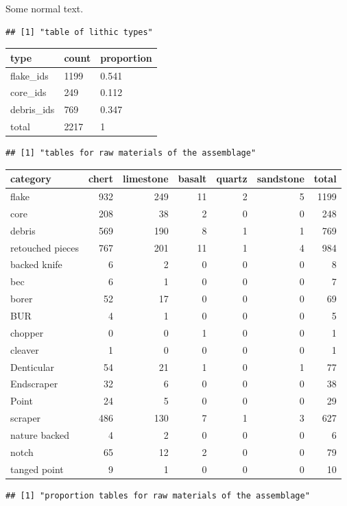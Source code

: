 \documentclass[]{article}
\title{}
\author{}
\date{}
\begin{document}
Some normal text.

\begin{verbatim}
## [1] "table of lithic types"
\end{verbatim}

\begin{longtable}[]{@{}lll@{}}
\toprule
type & count & proportion\tabularnewline
\midrule
\endhead
flake\_ids & 1199 & 0.541\tabularnewline
core\_ids & 249 & 0.112\tabularnewline
debris\_ids & 769 & 0.347\tabularnewline
total & 2217 & 1\tabularnewline
\bottomrule
\end{longtable}

\begin{verbatim}
## [1] "tables for raw materials of the assemblage"
\end{verbatim}

\begin{longtable}[]{@{}lrrrrrr@{}}
\toprule
category & chert & limestone & basalt & quartz & sandstone &
total\tabularnewline
\midrule
\endhead
flake & 932 & 249 & 11 & 2 & 5 & 1199\tabularnewline
core & 208 & 38 & 2 & 0 & 0 & 248\tabularnewline
debris & 569 & 190 & 8 & 1 & 1 & 769\tabularnewline
retouched pieces & 767 & 201 & 11 & 1 & 4 & 984\tabularnewline
backed knife & 6 & 2 & 0 & 0 & 0 & 8\tabularnewline
bec & 6 & 1 & 0 & 0 & 0 & 7\tabularnewline
borer & 52 & 17 & 0 & 0 & 0 & 69\tabularnewline
BUR & 4 & 1 & 0 & 0 & 0 & 5\tabularnewline
chopper & 0 & 0 & 1 & 0 & 0 & 1\tabularnewline
cleaver & 1 & 0 & 0 & 0 & 0 & 1\tabularnewline
Denticular & 54 & 21 & 1 & 0 & 1 & 77\tabularnewline
Endscraper & 32 & 6 & 0 & 0 & 0 & 38\tabularnewline
Point & 24 & 5 & 0 & 0 & 0 & 29\tabularnewline
scraper & 486 & 130 & 7 & 1 & 3 & 627\tabularnewline
nature backed & 4 & 2 & 0 & 0 & 0 & 6\tabularnewline
notch & 65 & 12 & 2 & 0 & 0 & 79\tabularnewline
tanged point & 9 & 1 & 0 & 0 & 0 & 10\tabularnewline
\bottomrule
\end{longtable}

\begin{verbatim}
## [1] "proportion tables for raw materials of the assemblage"
\end{verbatim}
\end{document}
